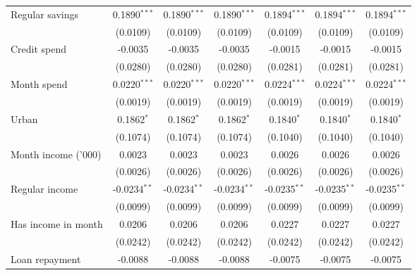 \begin{table}[htbp]
\begin{footnotesize}
\begin{tabular}{lcccccc}
         Regular savings             & 0.1890$^{***}$ & 0.1890$^{***}$ & 0.1890$^{***}$ & 0.1894$^{***}$ & 0.1894$^{***}$ & 0.1894$^{***}$\\
                                     & (0.0109)       & (0.0109)       & (0.0109)       & (0.0109)       & (0.0109)       & (0.0109)\\
         Credit spend                & -0.0035        & -0.0035        & -0.0035        & -0.0015        & -0.0015        & -0.0015\\
                                     & (0.0280)       & (0.0280)       & (0.0280)       & (0.0281)       & (0.0281)       & (0.0281)\\
         Month spend                 & 0.0220$^{***}$ & 0.0220$^{***}$ & 0.0220$^{***}$ & 0.0224$^{***}$ & 0.0224$^{***}$ & 0.0224$^{***}$\\
                                     & (0.0019)       & (0.0019)       & (0.0019)       & (0.0019)       & (0.0019)       & (0.0019)\\
         Urban                       & 0.1862$^{*}$   & 0.1862$^{*}$   & 0.1862$^{*}$   & 0.1840$^{*}$   & 0.1840$^{*}$   & 0.1840$^{*}$\\
                                     & (0.1074)       & (0.1074)       & (0.1074)       & (0.1040)       & (0.1040)       & (0.1040)\\
         Month income ('000)         & 0.0023         & 0.0023         & 0.0023         & 0.0026         & 0.0026         & 0.0026\\
                                     & (0.0026)       & (0.0026)       & (0.0026)       & (0.0026)       & (0.0026)       & (0.0026)\\
         Regular income              & -0.0234$^{**}$ & -0.0234$^{**}$ & -0.0234$^{**}$ & -0.0235$^{**}$ & -0.0235$^{**}$ & -0.0235$^{**}$\\
                                     & (0.0099)       & (0.0099)       & (0.0099)       & (0.0099)       & (0.0099)       & (0.0099)\\
         Has income in month         & 0.0206         & 0.0206         & 0.0206         & 0.0227         & 0.0227         & 0.0227\\
                                     & (0.0242)       & (0.0242)       & (0.0242)       & (0.0242)       & (0.0242)       & (0.0242)\\
         Loan repayment              & -0.0088        & -0.0088        & -0.0088        & -0.0075        & -0.0075        & -0.0075\\

\end{tabular}
\end{footnotesize}
\end{table}
